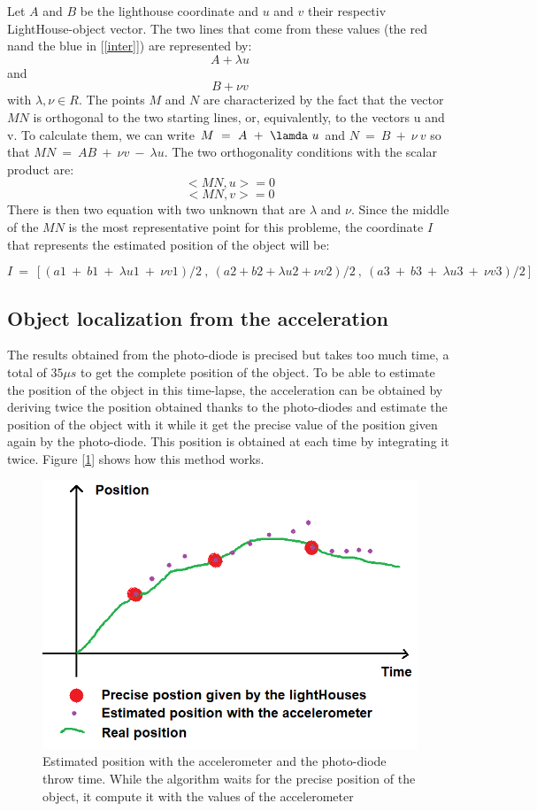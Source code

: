 \documentclass{vldb}
\begin{document}
Let $A$ and $B$ be the lighthouse coordinate and $u$ and $v$ their respectiv LightHouse-object vector. The two lines that come from these values (the red nand the blue in [\ref{inter}]) are represented by:
$$ A  + \lambda u $$ and $$B + \nu v$$ with $\lambda,\nu \in R$. 
The points $M$ and $N$ are characterized by the fact that the vector $MN$ is orthogonal to the two starting lines, or, equivalently, to the vectors u and v. To calculate them, we can write $M~=~A~+~\lamda~u$ and $N~=~ B ~+~ \nu~v$ so that $MN~=~ AB~+~ \nu v~-~\lambda u$. The two orthogonality conditions with the scalar product are:
$$<MN,u> = 0$$
$$<MN,v> = 0
$$
There is then two equation with two unknown that are $\lambda$ and $\nu$. Since the middle of the $MN$ is the most representative point for this probleme, the coordinate $I$ that represents the estimated position of the object will be:

$$
 I ~=~[ (a1 ~+ ~b1~ +~ \lambda u1 ~+~ \nu v1) / 2~ ,~   (a2 + b2 + \lambda u2 + \nu v2) / 2 ~,  ~ (a3~ +~ b3~ +~ \lambda u3 ~+~ \nu v3) / 2 ]
 $$
 
 \subsection{Object localization from the acceleration}
 The results obtained from the photo-diode is precised but takes too much time, a total of $35 \mu s $ to get the complete position of the object. To be able to estimate the position of the object in this time-lapse, the acceleration can be obtained by deriving twice the position obtained thanks to the photo-diodes and estimate the position of the object with it while it get the precise value of the position given again by the photo-diode. This position is obtained at each time by integrating it twice. Figure [\ref{axel}] shows how this method works.
 \begin{figure}
 \centering
\includegraphics[width=1.0\columnwidth]{Image/axel.png}
\caption{Estimated position with the accelerometer and the photo-diode throw time. While the algorithm waits for the precise position of the object, it compute it with the values of the accelerometer}
\label{axel}
\end{figure}
\end{document}
